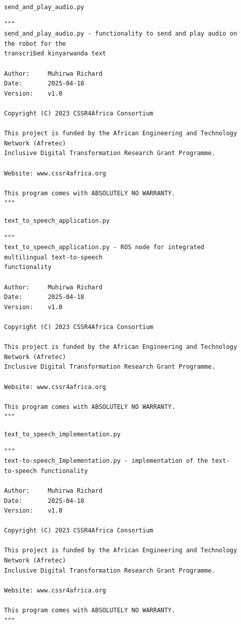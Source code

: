 \documentclass{CSSRforAfrica}
\newcommand{\checkboxChecked}{\fbox{\ding{51}}} %
\begin{document}
\begin{description}

\item[\checkboxChecked] {\small \verb+send_and_play_audio.py+}
{\scriptsize \begin{verbatim}
"""
send_and_play_audio.py - functionality to send and play audio on the robot for the
transcribed kinyarwanda text

Author:     Muhirwa Richard
Date:       2025-04-18
Version:    v1.0

Copyright (C) 2023 CSSR4Africa Consortium

This project is funded by the African Engineering and Technology Network (Afretec)
Inclusive Digital Transformation Research Grant Programme.

Website: www.cssr4africa.org

This program comes with ABSOLUTELY NO WARRANTY.
"""
\end{verbatim} }

\item[\checkboxChecked] {\small \verb+text_to_speech_application.py+}
{\scriptsize \begin{verbatim}
""" 
text_to_speech_application.py - ROS node for integrated multilingual text-to-speech
functionality

Author:     Muhirwa Richard
Date:       2025-04-18
Version:    v1.0

Copyright (C) 2023 CSSR4Africa Consortium

This project is funded by the African Engineering and Technology Network (Afretec) 
Inclusive Digital Transformation Research Grant Programme.

Website: www.cssr4africa.org

This program comes with ABSOLUTELY NO WARRANTY.
"""
\end{verbatim} }

\item[\checkboxChecked] {\small \verb+text_to_speech_implementation.py+}
{\scriptsize \begin{verbatim}
""" 
text-to-speech_Implementation.py - implementation of the text-to-speech functionality

Author:     Muhirwa Richard
Date:       2025-04-18
Version:    v1.0

Copyright (C) 2023 CSSR4Africa Consortium

This project is funded by the African Engineering and Technology Network (Afretec)
Inclusive Digital Transformation Research Grant Programme.

Website: www.cssr4africa.org

This program comes with ABSOLUTELY NO WARRANTY.
"""
\end{verbatim} }

\end{description}
\end{document}
